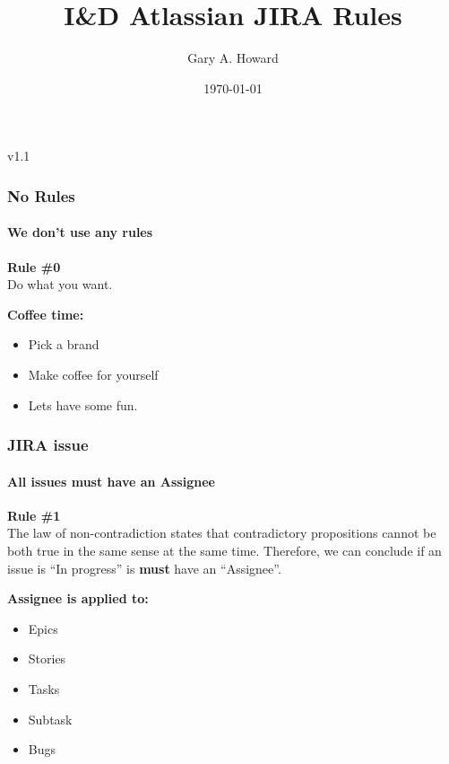 \documentclass[10pt]{beamer}%
\title{I\&D Atlassian JIRA Rules}%
\date{\today}%
\author{Gary A. Howard}%
\begin{document}
%


\begin{frame}%
\titlepage%
\begin{center}%
  \textcolor{HavasuBlue}{v1.1}%
\end{center}%
\end{frame}%


\begin{frame}%
  \frametitle{\hspace{4mm}No Rules}%
  \framesubtitle{\hspace{4mm}We don't use any rules}%
  \begin{mdframed}[style=HavasuLightBlueStyle]%
    \textbf{Rule \#0}\\%
    Do what you want.
  \end{mdframed}%
  \begin{mdframed}[style=HavasuLightGreenStyle]%
    \textbf{Coffee time:}%
    \begin{itemize}%
      \item Pick a brand%
      \item Make coffee for yourself %
      \item Lets have some fun.%
    \end{itemize}%
  \end{mdframed}%
\end{frame}%


\begin{frame}%
  \frametitle{\hspace{4mm}JIRA issue}%
  \framesubtitle{\hspace{4mm}All issues must have an Assignee}%
  \begin{mdframed}[style=HavasuLightBlueStyle]%
    \textbf{Rule \#1}\\%
    The law of non-contradiction states that contradictory propositions cannot
    be both true in the same sense at the same time.  Therefore, we can conclude
    if an issue is ``In progress'' is \textbf{must} have an ``Assignee''.
  \end{mdframed}%
  \begin{mdframed}[style=HavasuLightGreenStyle]%
    \textbf{Assignee is applied to:}%
    \begin{itemize}%
      \item Epics%
      \item Stories%
      \item Tasks%
      \item Subtask%
      \item Bugs%
    \end{itemize}%
  \end{mdframed}%
\end{frame}%
\end{document}
